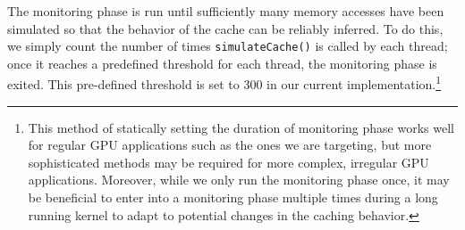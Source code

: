 \vspace{-0.2cm}
{\scriptsize
\begin{flushleft}
\verb%  simulateCache(addr, accessId, cacheConfig) {%
\\ \verb%       addr /= CACHELINESIZE;%
\\ \verb%%
\\ \verb%       if(addr == cacheConfig.cacheLine[accessId].addr)%
\\ \verb%            cacheConfig.cacheLine[accessId].hit ++;%
\\ \verb%       else {%
\\ \verb%            cacheConfig.cacheLine[accessId].miss ++;%
\\ \verb%            cacheConfig.cacheLine[accessId].addr = addr;%
\\ \verb%       }%
\\ \verb%  }%
\end{flushleft}
}


\vspace{-0.2cm}
%

The monitoring phase is run until sufficiently many memory accesses have been simulated so that the
behavior of the cache can be reliably inferred. 
To do this, we simply count the number of times \texttt{simulateCache()} is called by each thread;
once it reaches a predefined threshold for each thread, the monitoring phase is exited.
This pre-defined threshold is set to 300 in our current implementation.\footnote{
	This method of statically setting the duration of monitoring phase works 
	well for regular GPU applications such as the ones we are targeting, but
	more sophisticated methods may be required for more complex,  
	irregular GPU applications. 
	Moreover, while we only run the monitoring phase once, it may be beneficial
	to enter into a monitoring phase multiple times during a long running kernel 
	to adapt to potential changes in the caching behavior.}





